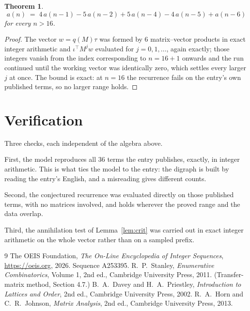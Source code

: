 \documentclass[11pt,a4paper]{article}
\theoremstyle{plain}
\newtheorem{theorem}{Theorem}
\theoremstyle{definition}
\begin{document}
\begin{theorem}
\[
a(n)\;=\;4\,a(n-1) - 5\,a(n-2) + 5\,a(n-4) - 4\,a(n-5) + a(n-6)
\]
for every $n>16$.
\end{theorem}

\begin{proof}
The vector $w=q(M)\tau$ was formed by $6$ matrix--vector products in exact integer
arithmetic and $\iota^{\!\top}M^{j}w$ evaluated for $j=0,1,\dots$, again exactly; those
integers vanish from the index corresponding to $n=16+1$ onwards and the run continued
until the working vector was identically zero, which settles every larger $j$ at once. The bound is exact: at $n=16$ the recurrence fails on the entry's own published terms, so no larger range holds.
\end{proof}

\section{Verification}

Three checks, each independent of the algebra above.

First, the model reproduces all $36$ terms the entry publishes, exactly, in integer
arithmetic. This is what ties the model to the entry: the digraph is built by reading the
entry's English, and a misreading gives different counts.

Second, the conjectured recurrence was evaluated directly on those published terms, with no
matrices involved, and holds wherever the proved range and the data overlap.

Third, the annihilation test of Lemma~\ref{lem:crit} was carried out in exact integer
arithmetic on the whole vector rather than on a sampled prefix.

\begin{thebibliography}{9}
 The OEIS Foundation, \emph{The On-Line Encyclopedia of Integer
Sequences}, \url{https://oeis.org}, 2026. Sequence A253395.
 R.~P.~Stanley, \emph{Enumerative Combinatorics}, Volume 1, 2nd ed.,
Cambridge University Press, 2011. (Transfer-matrix method, Section 4.7.)
 B.~A.~Davey and H.~A.~Priestley, \emph{Introduction to Lattices and
Order}, 2nd ed., Cambridge University Press, 2002.
 R.~A.~Horn and C.~R.~Johnson, \emph{Matrix Analysis}, 2nd ed., Cambridge
University Press, 2013.
\end{thebibliography}
\end{document}
